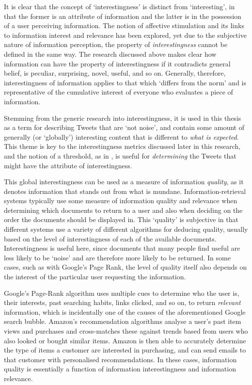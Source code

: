 It is clear that the concept of `interestingness' is distinct from `interesting', in that the former is an attribute of information and the latter is in the possession of a user perceiving information. The notion of affective stimulation and its links to information interest and relevance has been explored, yet due to the subjective nature of information perception, the property of \textit{interestingness} cannot be defined in the same way. The research discussed above makes clear how information can have the property of interestingness if it contradicts general belief, is peculiar, surprising, novel, useful, and so on. Generally, therefore, interestingness of information applies to that which `differs from the norm' and is representative of the cumulative interest of everyone who evaluates a piece of information. 

Stemming from the generic research into interestingness, it is used in this thesis as a term for describing Tweets that are `not noise', and contain some amount of generally (or `globally') interesting content that is different to \textit{what is expected}. This theme is key to the interestingness metrics discussed later in this research, and the notion of a threshold, as in \cite{mitra02}, is useful for \textit{determining} the Tweets that might have the attribute of interestingness. 

This global interestingness can be used as a measure of information \textit{quality}, as it denotes information that stands out from what is mundane. Information-retrieval systems typically use some measure of information quality and relevance when determining which documents to return to a user and also when deciding on the order the documents should be displayed in. This `quality' is subjective in that different systems use a variety of different algorithms for deducing quality, usually based on the level of interestingness of each of the available documents. Interestingness is useful here, since documents that many people find useful are less likely to be `noise' and are therefore more likely to be returned. In some cases, such as with Google's Page Rank, the level of quality itself also depends on the interest of the particular user requesting the information. 

Google's Page-Rank algorithm uses multiple cues to determine who the user is, their interests, past searching habits, links clicked, and so on, to return \textit{relevant} information, which is incidentally one of the causes of the aforementioned Google search bubble. Amazon's recommendation algorithms analyse a user's past item views and purchases and cross-matches these against trends based from users who also looked or bought similar items. Amazon is then able to accurately determine the type of items a customer are interested in purchasing, and can send emails to that customer with personalised recommendations. In these cases, information quality is essentially a function of information interestingness and information relevance.

